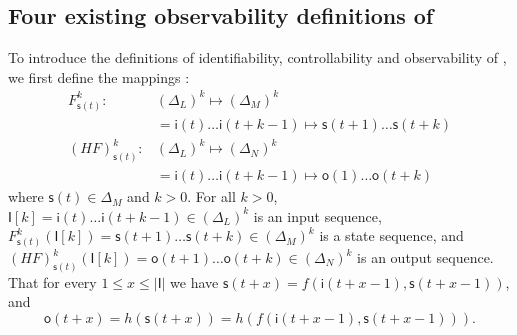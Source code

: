%  



\subsection{Four existing observability definitions of \BCNs}
To introduce the definitions of identifiability, controllability and observability of \BCNs, we first define the mappings \cite{Zhang2016Observability}:
\begin{equation}
\begin{split}
F^k_{\mathsf{s}(t)}:& (\Delta_L)^k\mapsto(\Delta_M)^k\\
&=\mathsf{i}(t)\ldots\mathsf{i}({t+k-1}) \mapsto \mathsf{s}(t+1)\ldots\mathsf{s}(t+k)\\
(HF)^k_{\mathsf{s}(t)} :& (\Delta_L)^k\mapsto(\Delta_N)^k\\
 &=\mathsf{i}(t)\ldots\mathsf{i}(t+k-1) \mapsto \mathsf{o}(1)\ldots\mathsf{o}(t+k)
\end{split}
\label{equ:6}
\end{equation}
where $\mathsf{s}(t)\in \Delta_M$ and $k>0$. For all  $k>0$,
$\mathsf{I}[k]=\mathsf{i}(t)\ldots\mathsf{i}({t+k-1}) \in(\Delta_L)^k$
is an input sequence, 
$F^k_{\mathsf{s}(t)}(\mathsf{I}[k])=\mathsf{s}(t+1)\ldots\mathsf{s}(t+k) \in(\Delta_M)^k$
 is a state sequence, and 
 $(HF)^k_{\mathsf{s}(t)}(\mathsf{I}[k])=\mathsf{o}(t+1)\ldots\mathsf{o}(t+k) \in(\Delta_N)^k$
 is an output sequence. That for every $1\le x \le |\mathsf{I}|$ we have 
 $\mathsf{s}(t+x)=f(\mathsf{i}(t+x-1),\mathsf{s}(t+x-1))$,
and 
 \[\mathsf{o}(t+x)=h(\mathsf{s}(t+x))=h(f(\mathsf{i}(t+x-1),\mathsf{s}(t+x-1))).\] 



